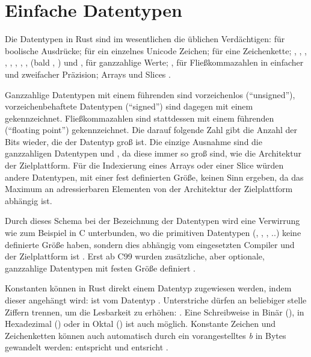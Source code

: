 \section{Einfache Datentypen}
\label{rust:types:simple}

Die Datentypen in Rust sind im wesentlichen die üblichen  Verdächtigen:  für boolische Ausdrücke;  für ein einzelnes Unicode Zeichen;  für eine Zeichenkette; , , , , , , , , (bald ,  \cite{rust:github:128bit_integer:rfc}) und ,   für ganzzahlige Werte; ,  für Fließkommazahlen in einfacher und zweifacher Präzision; Arrays und Slices \cite{rust:book:primitives}.

Ganzzahlige Datentypen mit einem führenden  sind vorzeichenlos (\enquote{unsigned}), vorzeichenbehaftete Datentypen (\enquote{signed}) sind dagegen mit einem  gekennzeichnet.
Fließkommazahlen sind stattdessen mit einem führenden  (\enquote{floating point}) gekennzeichnet.
Die darauf folgende Zahl gibt die Anzahl der Bits wieder, die der Datentyp groß ist.
Die einzige Ausnahme sind die ganzzahligen Datentypen  und , da diese immer so groß sind, wie die Architektur der Zielplattform.
Für die Indexierung eines Arrays oder einer Slice würden andere Datentypen, mit einer fest definierten Größe, keinen Sinn ergeben, da das Maximum an adressierbaren Elementen von der Architektur der Zielplattform abhängig ist.

Durch dieses Schema bei der Bezeichnung der Datentypen wird eine Verwirrung wie zum Beispiel in C unterbunden, wo die primitiven Datentypen (, , , ..) keine definierte Größe haben, sondern dies abhängig vom eingesetzten Compiler und der Zielplattform ist \cite[187]{deitel2013c}. Erst ab C99 wurden zusätzliche, aber optionale, ganzzahlige Datentypen mit festen Größe definiert \cite[141]{goll2014c}.

Konstanten können in Rust direkt einem Datentyp zugewiesen werden, indem dieser angehängt wird:  ist vom Datentyp .
Unterstriche dürfen an beliebiger stelle Ziffern trennen, um die Lesbarkeit zu erhöhen: .
Eine Schreibweise in Binär (), in Hexadezimal () oder in Oktal () ist auch möglich. 
Konstante Zeichen und Zeichenketten können auch automatisch durch ein vorangestelltes \textit{b} in Bytes gewandelt werden:  entspricht  und  entsricht \rustcinline{&[0x61_u8, 0x62_u8, 0x63_u8]}.

